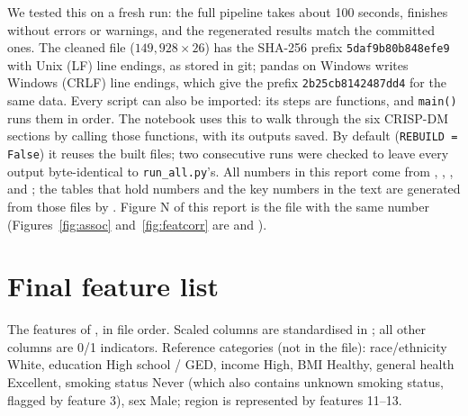 We tested this on a fresh run: the full pipeline takes about 100 seconds, finishes without errors or warnings, and the regenerated results match the committed ones. The cleaned file  ($149{,}928 \times 26$) has the SHA-256 prefix \texttt{5daf9b80b848efe9} with Unix (LF) line endings, as stored in git; pandas on Windows writes Windows (CRLF) line endings, which give the prefix \texttt{2b25cb8142487dd4} for the same data. Every script can also be imported: its steps are functions, and \texttt{main()} runs them in order. The notebook  uses this to walk through the six CRISP-DM sections by calling those functions, with its outputs saved. By default (\texttt{REBUILD = False}) it reuses the built files; two consecutive runs were checked to leave every output byte-identical to \texttt{run\_all.py}'s. All numbers in this report come from , , ,  and ; the tables that hold numbers and the key numbers in the text are generated from those files by . Figure N of this report is the file  with the same number (Figures~\ref{fig:assoc} and~\ref{fig:featcorr} are  and ).

\section{Final feature list}\label{app:features}

The \nFeatures features of , in file order. Scaled columns are standardised in ; all other columns are 0/1 indicators. Reference categories (not in the file): race/ethnicity White, education High school / GED, income High, BMI Healthy, general health Excellent, smoking status Never (which also contains unknown smoking status, flagged by feature 3), sex Male; region is represented by features 11--13.

\begin{table}[htbp]
\centering\small
\caption{The \nFeatures final features.}\label{tab:feature-list}

\end{table}

